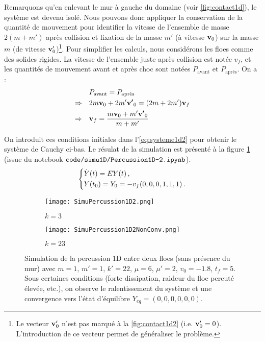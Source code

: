 Remarquons qu'en enlevant le mur à gauche du domaine (voir \cref{fig:contact1d}), le système est devenu isolé. Nous pouvons donc appliquer la conservation de la quantité de mouvement pour identifier la vitesse de l'ensemble de masse $2(m+m')$ après collision et fixation de la masse $m'$ (à vitesse $\bm{\mathrm{v}}_0$) sur la masse $m$ (de vitesse $\bm{\mathrm{v}}'_0$)\footnote{Le vecteur $\bm{\mathrm{v}}'_0$ n'est pas marqué à la \cref{fig:contact1d2} (i.e. $\bm{\mathrm{v}}'_0 = 0$). L'introduction de ce vecteur permet de généraliser le problème.}. Pour simplifier les calculs, nous considérons les floes comme des solides rigides. La vitesse de l'ensemble juste après collision est notée $v_f$, et les quantités de mouvement avant et après choc sont notées $P_{\text{avant}}$ et $P_{\text{après}}$. On a :
\begin{align*}
    & \quad P_{\text{avant}} = P_{\text{après}} \\
    \Rightarrow & \quad 2m \bm{\mathrm{v}}_0 + 2m'\bm{\mathrm{v'}}_0 = (2m + 2m') \bm{\mathrm{v}}_f \\
    \Rightarrow & \quad \bm{\mathrm{v}}_f = \frac{m \bm{\mathrm{v}}_0 + m'\bm{\mathrm{v'}}_0}{m+m'}
\end{align*} 

\noindent On introduit ces conditions initiales dans l'\cref{eq:systeme1d2} pour obtenir le système de Cauchy ci-bas. Le résulat de la simulation est présenté à la figure \cref{fig:simucontact1d2} (issue du notebook $\verb|code/simu1D/Percussion1D-2.ipynb|$). 
\begin{align} \label{eq:systeme1d3}
    \begin{dcases}
        \dot{Y}(t)= E Y(t) \,, \\
        Y(t_0) = Y_0 = -v_f(0,0,0,1,1,1) \,.        
    \end{dcases}
\end{align}

\begin{figure}[!h]
    \centering
    \begin{subfigure}{0.45\textwidth}
        \centering
        \texttt{[image: SimuPercussion1D2.png]}
        \caption{$k=3$}
    \end{subfigure}
    \begin{subfigure}{0.45\textwidth}
        \centering
        \texttt{[image: SimuPercussion1D2NonConv.png]}
        \caption{$k=23$}
    \end{subfigure}

    \caption{Simulation de la percussion 1D entre deux floes (sans présence du mur) avec $m=1$, $m'=1$, $k'=22$, $\mu=6$, $\mu'=2$, $v_0=-1.8$, $t_{f}=5$. Sous certaines conditions (forte dissipation, raideur du floe percuté élevée, etc.), on observe le ralentissement du système et une convergence vers l'état d'équilibre $Y_{eq}=(0,0,0,0,0,0)$.} 
    \label{fig:simucontact1d2}
\end{figure}

